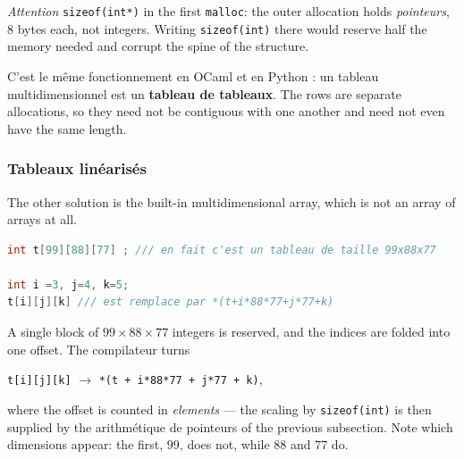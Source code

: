 \begin{remark}
  \textit{Attention} \verb|sizeof(int*)| in the first \verb|malloc|: the outer
  allocation holds \textit{pointeurs}, 8 bytes each, not integers. Writing
  \verb|sizeof(int)| there would reserve half the memory needed and corrupt the
  spine of the structure.
\end{remark}

\begin{remark}
  C'est le même fonctionnement en OCaml et en Python : un tableau
  multidimensionnel est un \textbf{tableau de tableaux}. The rows are separate
  allocations, so they need not be contiguous with one another and need not
  even have the same length.
\end{remark}

\subsubsection{Tableaux linéarisés}
The other solution is the built-in multidimensional array, which is not an
array of arrays at all.

\begin{lstlisting}[language=C]
int t[99][88][77] ; /// en fait c'est un tableau de taille 99x88x77

int i =3, j=4, k=5;
t[i][j][k] /// est remplace par *(t+i*88*77+j*77+k)
\end{lstlisting}

A single block of $99 \times 88 \times 77$ integers is reserved, and the
indices are folded into one offset. The compilateur turns
\begin{center}
  \verb|t[i][j][k]| $\longrightarrow$ \verb|*(t + i*88*77 + j*77 + k)|,
\end{center}
where the offset is counted in \textit{elements} --- the scaling by
\verb|sizeof(int)| is then supplied by the arithmétique de pointeurs of the
previous subsection. Note which dimensions appear: the first, $99$, does not, while
$88$ and $77$ do.

\begin{figure}[h!]
  \centering
\end{figure}

